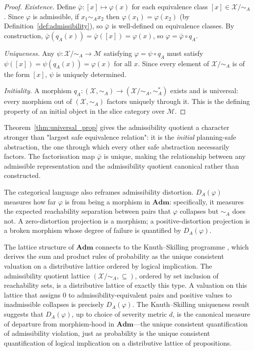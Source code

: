 \documentclass[10pt,twocolumn]{article}
\theoremstyle{plain}
\theoremstyle{definition}
\theoremstyle{remark}
\newcommand{\simA}{\sim_{\!A}}
\newcommand{\DA}{D_{A}(\varphi)}
\newcommand{\calX}{\mathcal{X}}
\newcommand{\calM}{\mathcal{M}}
\newcommand{\Xmod}[1]{\calX/{\sim_{#1}}}
\begin{document}
\begin{proof}
\emph{Existence.} Define $\bar{\varphi}:[x]\mapsto\varphi(x)$ for each
equivalence class $[x]\in\Xmod{A}$. Since $\varphi$ is admissible, if
$x_1\simA x_2$ then $\varphi(x_1)=\varphi(x_2)$ (by
Definition~\ref{def:admissibility}), so $\bar{\varphi}$ is well-defined on
equivalence classes. By construction, $\bar{\varphi}(q_A(x))=\bar{\varphi}([x])=\varphi(x)$,
so $\varphi=\bar{\varphi}\circ q_A$.

\emph{Uniqueness.} Any $\psi:\Xmod{A}\to\calM$ satisfying $\varphi=\psi\circ q_A$
must satisfy $\psi([x])=\psi(q_A(x))=\varphi(x)$ for all $x$. Since every
element of $\Xmod{A}$ is of the form $[x]$, $\psi$ is uniquely determined.

\emph{Initiality.} A morphism $q_A:(\calX,\simA)\to(\Xmod{A},\simA^*)$ exists
and is universal: every morphism out of $(\calX,\simA)$ factors uniquely through
it. This is the defining property of an initial object in the slice category
over $\calM$.
\end{proof}

Theorem~\ref{thm:universal_prop} gives the admissibility quotient a character
stronger than "largest safe equivalence relation": it is the \emph{initial}
planning-safe abstraction, the one through which every other safe abstraction
necessarily factors. The factorisation map $\bar{\varphi}$ is unique, making the
relationship between any admissible representation and the admissibility quotient
canonical rather than constructed.

The categorical language also reframes admissibility distortion. $\DA$ measures
how far $\varphi$ is from being a morphism in $\mathbf{Adm}$: specifically, it
measures the expected reachability separation between pairs that $\varphi$
collapses but $\simA$ does not. A zero-distortion projection is a morphism; a
positive-distortion projection is a broken morphism whose degree of failure is
quantified by $\DA$.

The lattice structure of $\mathbf{Adm}$ connects to the Knuth--Skilling
programme \citep{knuth2012foundations}, which derives the sum and product rules
of probability as the unique consistent valuation on a distributive lattice
ordered by logical implication. The admissibility quotient lattice
$(\mathcal{X}/{\simA}, \subseteq)$, ordered by set inclusion of reachability
sets, is a distributive lattice of exactly this type. A valuation on this
lattice that assigns $0$ to admissibility-equivalent pairs and positive values
to inadmissible collapses is precisely $\DA$. The Knuth--Skilling uniqueness
result suggests that $\DA$, up to choice of severity metric $d$, is the
canonical measure of departure from morphism-hood in $\mathbf{Adm}$---the
unique consistent quantification of admissibility violation, just as probability
is the unique consistent quantification of logical implication on a distributive
lattice of propositions.
\end{document}
